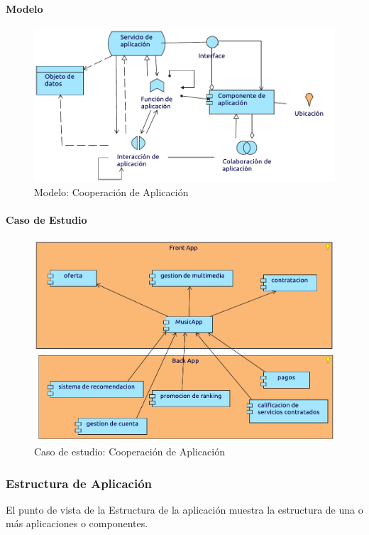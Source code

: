 \paragraph{Modelo}
\begin{figure}[h!]
	\centering
	\includegraphics[width=\linewidth]{Desarrollo/ArquitecturaEmpresarial/Aplicacion/imgs/CooperacionMetamodelo.pdf}
	\caption{Modelo: Cooperación de Aplicación}
\end{figure}
\newpage
\paragraph{Caso de Estudio}

\begin{figure}[h!]
	\centering
	\includegraphics[width=\linewidth]{Desarrollo/ArquitecturaEmpresarial/Aplicacion/imgs/Cooperacion.pdf}
	\caption{Caso de estudio: Cooperación de Aplicación }
\end{figure}

\newpage

\subsubsection{Estructura de Aplicación}
El punto de vista de la Estructura de la aplicación muestra la estructura de una o más aplicaciones o componentes. \vspace{\baselineskip}

